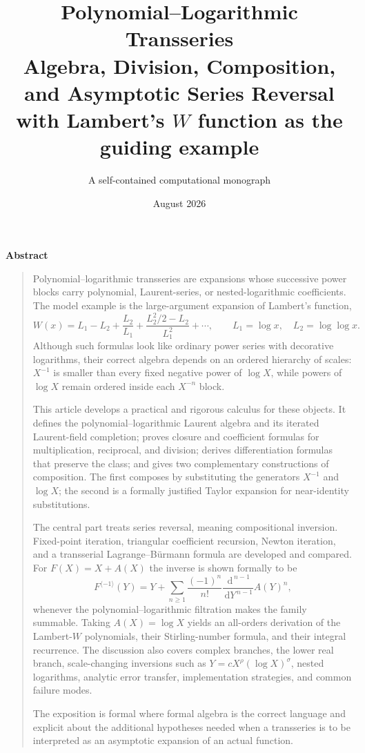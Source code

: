\documentclass[11pt,oneside]{book}
\title{\Huge\bfseries Polynomial--Logarithmic Transseries\\[0.4em]
\Large Algebra, Division, Composition, and Asymptotic Series Reversal\\[1em]
\large with Lambert's \texorpdfstring{$W$}{W} function as the guiding example}
\author{A self-contained computational monograph}
\date{August 2026}
\theoremstyle{definition}
\theoremstyle{remark}
\newenvironment{abstract}
  {\cleardoublepage\thispagestyle{plain}\begin{center}
   {\Large\bfseries Abstract}\end{center}\begin{quote}\small}
  {\end{quote}\cleardoublepage}
\newcommand{\dd}{\,\mathrm d}
\newcommand{\compinv}{^{\langle-1\rangle}}
\begin{document}
\frontmatter
\maketitle

\begin{abstract}
Polynomial--logarithmic transseries are expansions whose successive power
blocks carry polynomial, Laurent-series, or nested-logarithmic coefficients.
The model example is the large-argument expansion of Lambert's function,
\[
 W(x)=L_1-L_2+\frac{L_2}{L_1}
 +\frac{L_2^2/2-L_2}{L_1^2}+\cdots,
 \qquad L_1=\log x,\quad L_2=\log\log x.
\]
Although such formulas look like ordinary power series with decorative
logarithms, their correct algebra depends on an ordered hierarchy of scales:
$X^{-1}$ is smaller than every fixed negative power of $\log X$, while powers
of $\log X$ remain ordered inside each $X^{-n}$ block.

This article develops a practical and rigorous calculus for these objects.
It defines the polynomial--logarithmic Laurent algebra and its iterated
Laurent-field completion; proves closure and coefficient formulas for
multiplication, reciprocal, and division; derives differentiation formulas
that preserve the class; and gives two complementary constructions of
composition.  The first composes by substituting the generators
$X^{-1}$ and $\log X$; the second is a formally justified Taylor expansion
for near-identity substitutions.

The central part treats series reversal, meaning compositional inversion.
Fixed-point iteration, triangular coefficient recursion, Newton iteration,
and a transserial Lagrange--B\"urmann formula are developed and compared.
For $F(X)=X+A(X)$ the inverse is shown formally to be
\[
 F\compinv(Y)=Y+\sum_{n\ge1}\frac{(-1)^n}{n!}
 \frac{\dd^{\,n-1}}{\dd Y^{\,n-1}}A(Y)^n,
\]
whenever the polynomial--logarithmic filtration makes the family summable.
Taking $A(X)=\log X$ yields an all-orders derivation of the Lambert-$W$
polynomials, their Stirling-number formula, and their integral recurrence.
The discussion also covers complex branches, the lower real branch,
scale-changing inversions such as $Y=cX^\rho(\log X)^\sigma$, nested
logarithms, analytic error transfer, implementation strategies, and common
failure modes.

The exposition is formal where formal algebra is the correct language and
explicit about the additional hypotheses needed when a transseries is to be
interpreted as an asymptotic expansion of an actual function.
\end{abstract}
\end{document}

